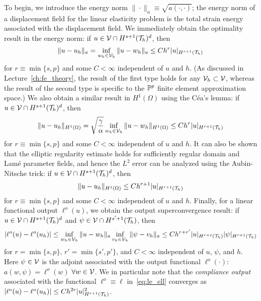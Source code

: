 To begin, we introduce the energy norm $\| \cdot \|_a \equiv \sqrt{a(\cdot,\cdot)}$; the energy norm of a displacement field for the linear elasticity problem is the total strain energy associated with the displacement field. We immediately obtain the optimality result in the energy norm: if $u \in \mathcal{V} \cap H^{s+1}(\mathcal{T}_h)^d$,  then
\begin{equation*}
  \| u - u_h \|_a = \inf_{w_h \in \mathcal{V}_h} \| u - w_h \|_a
  \leq C h^{r} | u |_{H^{r+1}(\mathcal{T}_h)}
\end{equation*}
for $r \equiv \min \{s, p \}$ and some $C < \infty$ independent of $u$ and $h$. (As discussed in Lecture~\ref{ch:fe_theory}, the result of the first type holds for any $\mathcal{V}_h \subset \mathcal{V}$, whereas the result of the second type is specific to the $\mathbb{P}^p$ finite element approximation space.) We also obtain a similar result in $H^1(\Omega)$ using the C\'ea's lemma: if $u \in \mathcal{V} \cap H^{s+1}(\mathcal{T}_h)^d$, then
\begin{equation*}
  \| u - u_h \|_{H^1(\Omega)} = \sqrt{\frac{\gamma}{\alpha}} \inf_{w_h \in \mathcal{V}_h} \| u - w_h \|_{H^1(\Omega)}
  \leq C h^{r} | u |_{H^{r+1}(\mathcal{T}_h)}
\end{equation*}
for $r \equiv \min \{s, p \}$ and some $C < \infty$ independent of $u$ and $h$.  It can also be shown that the elliptic regularity estimate holds for sufficiently regular domain and Lam\'e parameter fields, and hence the $L^2$ error can be analyzed using the Aubin-Nitsche trick: if $u \in \mathcal{V} \cap H^{s+1}(\mathcal{T}_h)^d$, then
\begin{equation*}
  \| u - u_h \|_{H^1(\Omega)} \leq C h^{r+1} | u |_{H^{r+1}(\mathcal{T}_h)}
\end{equation*}
for $r \equiv \min \{s, p \}$ and some $C < \infty$ independent of $u$ and $h$. Finally, for a linear functional output $\ell^o(u)$, we obtain the output superconvergence result: if $u \in \mathcal{V} \cap H^{s+1}(\mathcal{T}_h)^d$ and $\psi \in \mathcal{V} \cap H^{s'+1}(\mathcal{T}_h)$, then
\begin{equation*}
  | \ell^o(u) - \ell^o(u_h) |
  \leq \inf_{w_h \in \mathcal{V}_h} \| u - w_h \|_a \inf_{v_h \in \mathcal{V}_h} \| \psi - v_h \|_a \leq C h^{r + r'} | u |_{H^{r+1}(\mathcal{T}_h)} | \psi |_{H^{r+1}(\mathcal{T}_h)}
\end{equation*}
for $r = \min\{ s,p \}$, $r' = \min\{s',p'\}$, and $C < \infty$ independent of $u$, $\psi$, and $h$.  Here $\psi \in \mathcal{V}$ is the adjoint associated with the output functional $\ell^o(\cdot)$: $a(w,\psi) = \ell^o(w)$ $\forall w \in \mathcal{V}$.  We in particular note that the \emph{compliance output} associated with the functional $\ell^o \equiv \ell$ in~\eqref{eq:le_ell} converges as $| \ell^o(u) - \ell^o(u_h)| \leq C h^{2r} | u |_{H^{r+1}(\mathcal{T}_h)}^2$.

